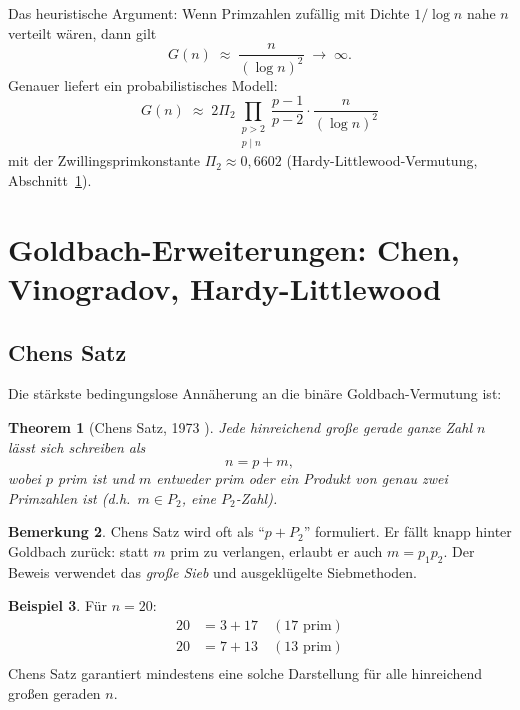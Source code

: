 \documentclass[12pt,a4paper]{amsart}
\newtheorem{theorem}{Theorem}[section]
\theoremstyle{definition}
\newtheorem{beispiel}[theorem]{Beispiel}
\newtheorem{bemerkung}[theorem]{Bemerkung}
\begin{document}
Das heuristische Argument: Wenn Primzahlen zuf\"{a}llig mit Dichte
$1/\log n$ nahe $n$ verteilt w\"{a}ren, dann gilt
\[
  G(n) \;\approx\; \frac{n}{(\log n)^2} \;\longrightarrow\; \infty.
\]
Genauer liefert ein probabilistisches Modell:
\[
  G(n) \;\approx\; 2\Pi_2
  \prod_{\substack{p > 2 \\ p \mid n}} \frac{p-1}{p-2}
  \cdot \frac{n}{(\log n)^2}
\]
mit der Zwillingsprimkonstante $\Pi_2 \approx 0{,}6602$
(Hardy-Littlewood-Vermutung, Abschnitt~\ref{sec:goldbach-ext}).

\section{Goldbach-Erweiterungen: Chen, Vinogradov,
Hardy-Littlewood}\label{sec:goldbach-ext}

\subsection{Chens Satz}

Die st\"{a}rkste bedingungslose Ann\"{a}herung an die bin\"{a}re
Goldbach-Vermutung ist:

\begin{theorem}[Chens Satz, 1973 \cite{Chen1973}]\label{thm:chen}
Jede hinreichend gro\ss{}e gerade ganze Zahl $n$ l\"{a}sst sich schreiben als
\[
  n = p + m,
\]
wobei $p$ prim ist und $m$ entweder prim oder ein Produkt von genau zwei
Primzahlen ist (d.h.\ $m \in P_2$, eine \emph{$P_2$-Zahl}).
\end{theorem}

\begin{bemerkung}
Chens Satz wird oft als ``$p + P_2$'' formuliert.  Er f\"{a}llt knapp
hinter Goldbach zur\"{u}ck: statt $m$ prim zu verlangen, erlaubt er
auch $m = p_1 p_2$.  Der Beweis verwendet das \emph{gro\ss{}e Sieb}
und ausgekl\"{u}gelte Siebmethoden.
\end{bemerkung}

\begin{beispiel}
F\"{u}r $n = 20$:
\begin{align*}
  20 &= 3 + 17 \quad (17 \text{ prim}) \\
  20 &= 7 + 13 \quad (13 \text{ prim}) \\
\end{align*}
Chens Satz garantiert mindestens eine solche Darstellung f\"{u}r alle
hinreichend gro\ss{}en geraden $n$.
\end{beispiel}
\end{document}
